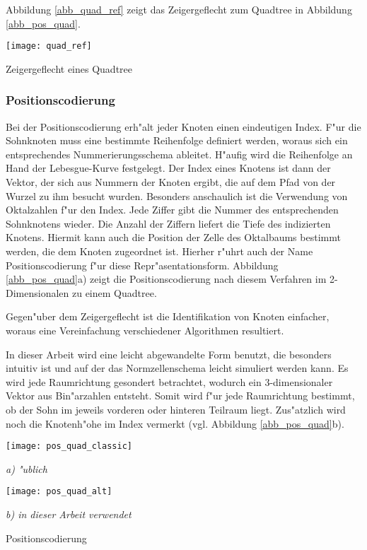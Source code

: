 Abbildung \ref{abb_quad_ref} zeigt das Zeigergeflecht zum Quadtree in 
Abbildung \ref{abb_pos_quad}.

\diabeg
\texttt{[image: quad\_ref]}
\caption{Zeigergeflecht eines Quadtree}
\label{abb_quad_ref}
\diaend

\subsubsection{Positionscodierung}
\label{pos_code}
Bei der Positionscodierung erh"alt jeder Knoten einen eindeutigen Index. 
F"ur die Sohnknoten muss eine bestimmte Reihenfolge definiert werden, woraus 
sich ein entsprechendes Nummerierungsschema ableitet.
H"aufig wird die Reihenfolge an Hand der Lebesgue-Kurve festgelegt. 
Der Index eines Knotens ist dann der Vektor, der sich aus Nummern der Knoten 
ergibt, die auf dem Pfad von der Wurzel zu ihm besucht wurden. 
Besonders anschaulich ist die Verwendung von Oktalzahlen f"ur den Index. 
Jede Ziffer gibt die Nummer des entsprechenden Sohnknotens wieder. Die Anzahl 
der Ziffern liefert die Tiefe des indizierten Knotens. Hiermit kann auch 
die Position der Zelle des Oktalbaums bestimmt werden, die dem Knoten 
zugeordnet ist. Hierher r"uhrt auch der Name Positionscodierung f"ur diese 
Repr"asentationsform. Abbildung \ref{abb_pos_quad}a) zeigt die 
Positionscodierung nach diesem Verfahren im 2-Dimensionalen zu einem Quadtree. 

Gegen"uber dem Zeigergeflecht ist die Identifikation von Knoten einfacher, 
woraus eine Vereinfachung verschiedener Algorithmen resultiert. 

In dieser Arbeit wird eine leicht abgewandelte Form benutzt, die besonders 
intuitiv ist und auf der das Normzellenschema leicht simuliert werden kann.
Es wird jede Raumrichtung gesondert betrachtet, wodurch ein 3-dimensionaler 
Vektor aus Bin"arzahlen entsteht. Somit wird f"ur jede Raumrichtung bestimmt, 
ob der Sohn im jeweils vorderen oder hinteren Teilraum liegt. 
Zus"atzlich wird noch die Knotenh"ohe im Index vermerkt (vgl. Abbildung 
\ref{abb_pos_quad}b). 

\diabeg[!t]
\texttt{[image: pos\_quad\_classic]}
\begin{center}
\emph{a) "ublich}
\end{center}
\vspace{1.5em}
\texttt{[image: pos\_quad\_alt]}
\begin{center}
\emph{b) in dieser Arbeit verwendet}
\end{center}
\caption{Positionscodierung}
\label{abb_pos_quad}
\diaend


